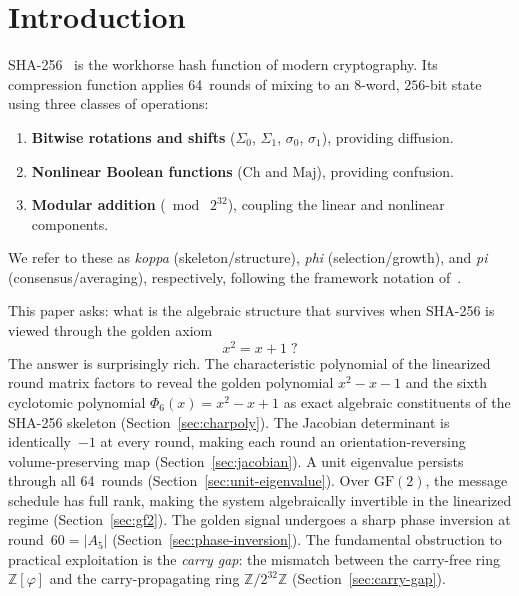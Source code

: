 \documentclass[12pt, a4paper]{article}
\theoremstyle{plain}
\theoremstyle{definition}
\newcommand{\Z}{\mathbb{Z}}
\newcommand{\GF}{\mathrm{GF}}
\newcommand{\Ch}{\mathrm{Ch}}
\newcommand{\Maj}{\mathrm{Maj}}
\newcommand{\vp}{\varphi}
\newcommand{\Zphi}{\Z[\vp]}
\begin{document}
\section{Introduction}\label{sec:intro}

SHA-256~\cite{fips180-4} is the workhorse hash function of modern
cryptography.
Its compression function applies 64~rounds of mixing to an
$8$-word, $256$-bit state using three classes of operations:
\begin{enumerate}[nosep]
  \item \textbf{Bitwise rotations and shifts} ($\Sigma_{0}$,
        $\Sigma_{1}$, $\sigma_{0}$, $\sigma_{1}$), providing
        diffusion.
  \item \textbf{Nonlinear Boolean functions} ($\Ch$ and $\Maj$),
        providing confusion.
  \item \textbf{Modular addition} ($\bmod\;2^{32}$), coupling
        the linear and nonlinear components.
\end{enumerate}
We refer to these as \emph{koppa} (skeleton/structure),
\emph{phi} (selection/growth), and \emph{pi}
(consensus/averaging), respectively, following the framework
notation of~\cite{pythagorean-framework}.

This paper asks: what is the algebraic structure that survives
when SHA-256 is viewed through the golden axiom
\begin{equation}\label{eq:axiom}
  x^{2} = x + 1\;?
\end{equation}
The answer is surprisingly rich.
The characteristic polynomial of the linearized round matrix
factors to reveal the golden polynomial $x^{2}-x-1$ and the
sixth cyclotomic polynomial $\Phi_{6}(x)=x^{2}-x+1$ as exact
algebraic constituents of the SHA-256 skeleton
(Section~\ref{sec:charpoly}).
The Jacobian determinant is identically~$-1$ at every round,
making each round an orientation-reversing volume-preserving map
(Section~\ref{sec:jacobian}).
A unit eigenvalue persists through all 64~rounds
(Section~\ref{sec:unit-eigenvalue}).
Over $\GF(2)$, the message schedule has full rank, making the
system algebraically invertible in the linearized regime
(Section~\ref{sec:gf2}).
The golden signal undergoes a sharp phase inversion at
round~$60=|A_{5}|$ (Section~\ref{sec:phase-inversion}).
The fundamental obstruction to practical exploitation is the
\emph{carry gap}: the mismatch between the carry-free ring
$\Zphi$ and the carry-propagating ring $\Z/2^{32}\Z$
(Section~\ref{sec:carry-gap}).
\end{document}
